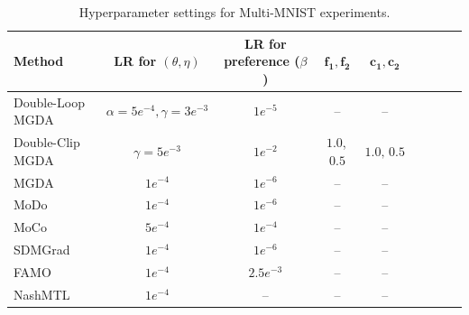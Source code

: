 \documentclass[twoside]{article} %
\theoremstyle{plain}
\theoremstyle{definition}
\theoremstyle{remark}
\begin{document}
\begin{table}[ht]
\centering
\caption{Hyperparameter settings for Multi-MNIST experiments.}
\label{Table: Learning Rate Hyper-parameter}
{
\scriptsize
\renewcommand{\arraystretch}{1.08}
\setlength{\tabcolsep}{1.5pt}
\begin{tabular*}{\textwidth}{
    @{\extracolsep{\fill}}
    lcccccccc
    @{}
}
\toprule
\textbf{Method} 
& \textbf{LR for $(\theta,\eta)$} 
& \textbf{LR for preference ($\beta$)} 
& $\boldsymbol{f_1,f_2}$ 
& $\boldsymbol{c_1,c_2}$ \\
\midrule
Double-Loop MGDA 
& $\alpha=5e^{-4},\gamma=3e^{-3}$ 
& $1e^{-5}$ 

& -- 
& -- \\

 Double-Clip MGDA 
& $\gamma=5e^{-3}$
& $1e^{-2}$ 
& $1.0$,\,$0.5$ 
& $1.0,\,0.5$ \\

MGDA~\citep{qimgda,MGDA1stwork} 
& $1e^{-4}$ 
& $1e^{-6}$ 
& -- 
& -- \\

MoDo~\citep{MODO} 
& $1e^{-4}$ 
& $1e^{-6}$ 
& -- 

& -- \\

MoCo~\citep{MOCO}
& $5e^{-4}$ 
& $1e^{-4}$ 
& -- 
& -- \\

SDMGrad~\citep{SDMkaiyiJi}
& $1e^{-4}$ 
& $1e^{-6}$ 
& -- 
& -- \\

FAMO~\citep{FAMO}
& $1e^{-4}$ 
& $2.5e^{-3}$ 
& -- 
& -- \\

NashMTL~\citep{nashMTL}
& $1e^{-4}$ 
& -- 
& -- 
& -- \\
\bottomrule
\end{tabular*}}
\end{table}
\end{document}

